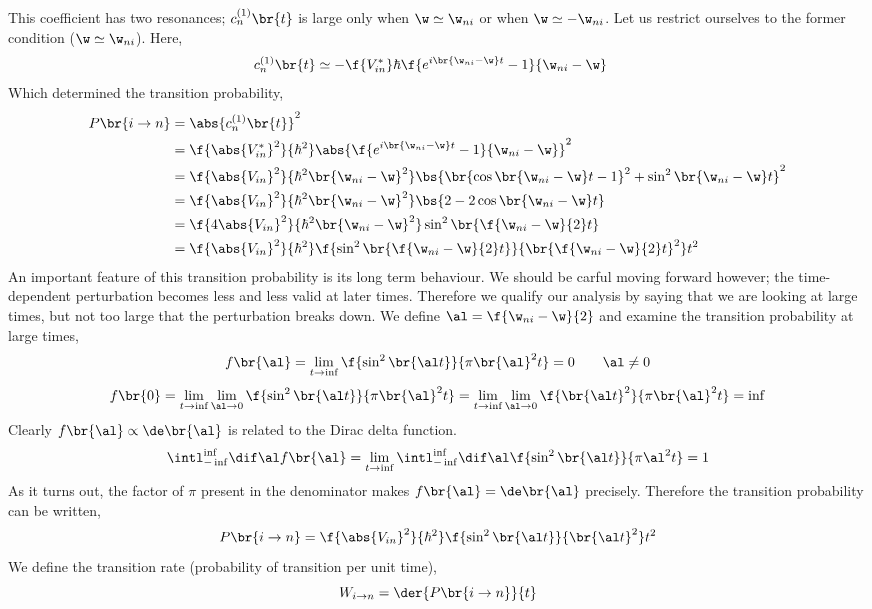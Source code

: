 \documentclass{article}
\begin{document}
This coefficient has two resonances; $c_n^{(1)}\br{t}$ is large only when $\w \simeq \w_{ni}$ or when $\w \simeq - \w_{ni}$. Let us restrict ourselves to the former condition ($\w \simeq \w_{ni}$). Here,
\begin{align*}
    c_n^{(1)}\br{t}
    &\simeq - \f {V^{*}_{in}} \hbar { \f{e^{i \br{\w_{ni} - \w} t} - 1}{\w_{ni} - \w}}
\end{align*}
Which determined the transition probability,
\begin{align*}
    P\br{i \to n}
    &= \abs{c_n^{(1)}\br{t}}^2 \\
    &= \f {\abs{V^{*}_{in}}^2} {\hbar^2} \abs{ \f{e^{i \br{\w_{ni} - \w} t} - 1}{\w_{ni} - \w}}^2 \\
    &= \f {\abs{V_{in}}^2} {\hbar^2  \br{\w_{ni} - \w}^2} \bs{\br{\cos \br{\w_{ni} - \w} t - 1}^2 + \sin^2 \br{\w_{ni} - \w} t}^2 \\
    &= \f {\abs{V_{in}}^2} {\hbar^2  \br{\w_{ni} - \w}^2} \bs{2 - 2 \cos \br{\w_{ni} - \w} t} \\
    &= \f {4\abs{V_{in}}^2} {\hbar^2  \br{\w_{ni} - \w}^2} \sin^2 \br{\f{\w_{ni} - \w}{2} t} \\
    &= \f {\abs{V_{in}}^2} {\hbar^2} \f{\sin^2 \br{\f{\w_{ni} - \w}{2} t}}{\br{\f{\w_{ni} - \w}{2} t}^2} t^2
\end{align*}
An important feature of this transition probability is its long term behaviour. We should be carful moving forward however; the time-dependent perturbation becomes less and less valid at later times. Therefore we qualify our analysis by saying that we are looking at large times, but not too large that the perturbation breaks down. We define $\al = \f{\w_{ni} - \w}{2}$ and examine the transition probability at large times,
\[ f\br{\al} = \lim_{t \to \inf}\f{\sin^2 \br{\al t}}{\pi \br{\al}^2 t} = 0 \qquad \al \neq 0 \]
\[ f\br{0} = \lim_{t \to \inf} \lim_{\al \to 0} \f{\sin^2 \br{\al t}}{\pi \br{\al}^2 t} = \lim_{t \to \inf} \lim_{\al \to 0} \f{\br{\al t}^2}{\pi \br{\al}^2 t} = \inf \]
Clearly $f\br{\al} \propto \de\br{\al}$ is related to the Dirac delta function.
\[ \intl_{-\inf}^{\inf} \dif \al f\br{\al} = \lim_{t \to \inf} \intl_{-\inf}^{\inf} \dif \al \f{\sin^2 \br{\al t}}{\pi \al^2 t} = 1 \]
As it turns out, the factor of $\pi$ present in the denominator makes $f\br{\al} = \de \br{\al}$ precisely. Therefore the transition probability can be written,
\[ P\br{i \to n} = \f {\abs{V_{in}}^2} {\hbar^2} \f{\sin^2 \br{\al t}}{\br{\al t}^2} t^2\]
We define the transition rate (probability of transition per unit time),
\[ W_{i \to n} = \der{P\br{i \to n}}{t} \]
\end{document}
